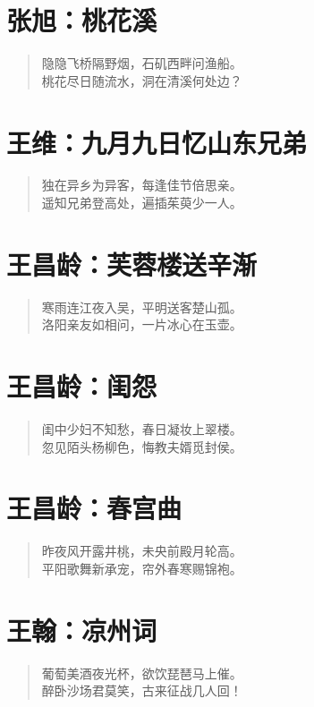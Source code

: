 \documentclass[12pt,oneside]{book}
\newenvironment{shici}{%
\begin{verse}\centering\yanti\large\hspace{12pt}}{\end{verse}}
\begin{document}
\begin{common-format}
\chapter{张旭：桃花溪}
\begin{shici}
隐隐飞桥隔野烟，石矶西畔问渔船。\\
桃花尽日随流水，洞在清溪何处边？
\end{shici}

\chapter{王维：九月九日忆山东兄弟}
\begin{shici}
独在异乡为异客，每逢佳节倍思亲。\\
遥知兄弟登高处，遍插茱萸少一人。
\end{shici}

\chapter{王昌龄：芙蓉楼送辛渐}
\begin{shici}
寒雨连江夜入吴，平明送客楚山孤。\\
洛阳亲友如相问，一片冰心在玉壶。
\end{shici}

\chapter{王昌龄：闺怨}
\begin{shici}
闺中少妇不知愁，春日凝妆上翠楼。\\
忽见陌头杨柳色，悔教夫婿觅封侯。
\end{shici}

\chapter{王昌龄：春宫曲}
\begin{shici}
昨夜风开露井桃，未央前殿月轮高。\\
平阳歌舞新承宠，帘外春寒赐锦袍。
\end{shici}

\chapter{王翰：凉州词}
\begin{shici}
葡萄美酒夜光杯，欲饮琵琶马上催。\\
醉卧沙场君莫笑，古来征战几人回！
\end{shici}


\end{common-format}
\end{document}
